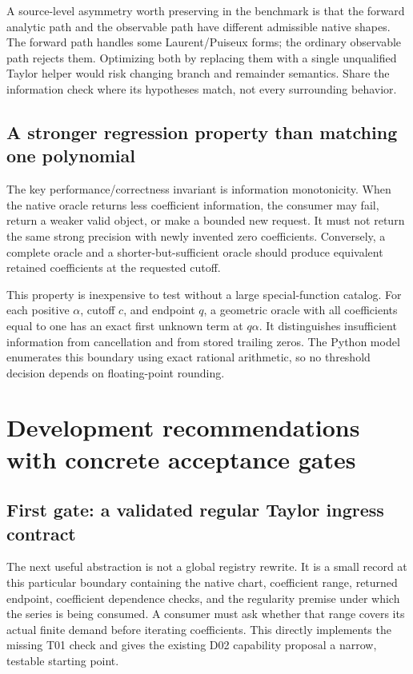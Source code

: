 \documentclass[11pt,letterpaper]{article}
\theoremstyle{definition}\newtheorem{definition}[proposition]{Definition}
\begin{document}
A source-level asymmetry worth preserving in the benchmark is that the forward
analytic path and the observable path have different admissible native shapes.
The forward path handles some Laurent/Puiseux forms; the ordinary observable
path rejects them. Optimizing both by replacing them with a single unqualified
Taylor helper would risk changing branch and remainder semantics. Share the
information check where its hypotheses match, not every surrounding behavior.
\cite{core,operations}

\subsection{A stronger regression property than matching one polynomial}
The key performance/correctness invariant is information monotonicity.
When the native oracle returns less coefficient information, the consumer may
fail, return a weaker valid object, or make a bounded new request. It must not
return the same strong precision with newly invented zero coefficients.
Conversely, a complete oracle and a shorter-but-sufficient oracle should
produce equivalent retained coefficients at the requested cutoff.

This property is inexpensive to test without a large special-function catalog.
For each positive $\alpha$, cutoff $c$, and endpoint $q$, a geometric oracle
with all coefficients equal to one has an exact first unknown term at
$q\alpha$. It distinguishes insufficient information from cancellation and
from stored trailing zeros. The Python model enumerates this boundary using
exact rational arithmetic, so no threshold decision depends on floating-point
rounding.

\section{Development recommendations with concrete acceptance gates}
\subsection{First gate: a validated regular Taylor ingress contract}
The next useful abstraction is not a global registry rewrite. It is a small
record at this particular boundary containing the native chart, coefficient
range, returned endpoint, coefficient dependence checks, and the regularity
premise under which the series is being consumed. A consumer must ask whether
that range covers its actual finite demand before iterating coefficients.
This directly implements the missing T01 check and gives the existing D02
capability proposal a narrow, testable starting point.\cite{register}
\end{document}
